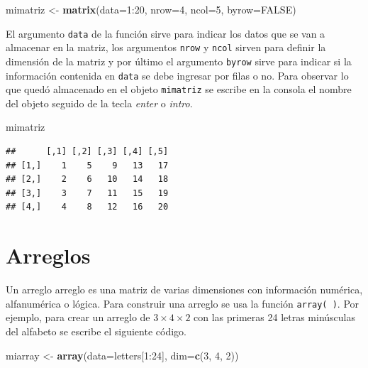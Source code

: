 \documentclass[10pt,]{krantz}
\makeatletter
\newenvironment{Shaded}{\begin{snugshade}}{\end{snugshade}}
\newcommand{\KeywordTok}[1]{\textcolor[rgb]{0.13,0.29,0.53}{\textbf{{#1}}}}
\newcommand{\DataTypeTok}[1]{\textcolor[rgb]{0.13,0.29,0.53}{{#1}}}
\newcommand{\DecValTok}[1]{\textcolor[rgb]{0.00,0.00,0.81}{{#1}}}
\newcommand{\StringTok}[1]{\textcolor[rgb]{0.31,0.60,0.02}{{#1}}}
\newcommand{\OtherTok}[1]{\textcolor[rgb]{0.56,0.35,0.01}{{#1}}}
\newcommand{\NormalTok}[1]{{#1}}
\newenvironment{kframe}{%
\medskip{}
\setlength{\fboxsep}{.8em}
 \def\at@end@of@kframe{}%
 \ifinner\ifhmode%
  \def\at@end@of@kframe{\end{minipage}}%
  \begin{minipage}{\columnwidth}%
 \fi\fi%
 \def\FrameCommand##1{\hskip\@totalleftmargin \hskip-\fboxsep
 \colorbox{shadecolor}{##1}\hskip-\fboxsep
     \hskip-\linewidth \hskip-\@totalleftmargin \hskip\columnwidth}%
 \MakeFramed {\advance\hsize-\width
   \@totalleftmargin\z@ \linewidth\hsize
   \@setminipage}}%
 {\par\unskip\endMakeFramed%
 \at@end@of@kframe}
\renewenvironment{Shaded}{\begin{kframe}}{\end{kframe}}
\makeatother
\begin{document}
\begin{Shaded}
\begin{Highlighting}[]
\NormalTok{mimatriz <-}\StringTok{ }\KeywordTok{matrix}\NormalTok{(}\DataTypeTok{data=}\DecValTok{1}\NormalTok{:}\DecValTok{20}\NormalTok{, }\DataTypeTok{nrow=}\DecValTok{4}\NormalTok{, }\DataTypeTok{ncol=}\DecValTok{5}\NormalTok{, }\DataTypeTok{byrow=}\OtherTok{FALSE}\NormalTok{)}
\end{Highlighting}
\end{Shaded}

El argumento \texttt{data} de la función sirve para indicar los datos
que se van a almacenar en la matriz, los argumentos \texttt{nrow} y
\texttt{ncol} sirven para definir la dimensión de la matriz y por último
el argumento \texttt{byrow} sirve para indicar si la información
contenida en \texttt{data} se debe ingresar por filas o no. Para
observar lo que quedó almacenado en el objeto \texttt{mimatriz} se
escribe en la consola el nombre del objeto seguido de la tecla
\textit{enter} o \textit{intro}.

\begin{Shaded}
\begin{Highlighting}[]
\NormalTok{mimatriz}
\end{Highlighting}
\end{Shaded}

\begin{verbatim}
##      [,1] [,2] [,3] [,4] [,5]
## [1,]    1    5    9   13   17
## [2,]    2    6   10   14   18
## [3,]    3    7   11   15   19
## [4,]    4    8   12   16   20
\end{verbatim}

\section{\texorpdfstring{Arreglos 
}{Arreglos  }}\label{arreglos}

Un arreglo arreglo es una matriz de varias dimensiones con información
numérica, alfanumérica o lógica. Para construir una arreglo se usa la
función \texttt{array(\ )}. Por ejemplo, para crear un arreglo de
\(3 \times 4 \times 2\) con las primeras 24 letras minúsculas del
alfabeto se escribe el siguiente código.

\begin{Shaded}
\begin{Highlighting}[]
\NormalTok{miarray <-}\StringTok{ }\KeywordTok{array}\NormalTok{(}\DataTypeTok{data=}\NormalTok{letters[}\DecValTok{1}\NormalTok{:}\DecValTok{24}\NormalTok{], }\DataTypeTok{dim=}\KeywordTok{c}\NormalTok{(}\DecValTok{3}\NormalTok{, }\DecValTok{4}\NormalTok{, }\DecValTok{2}\NormalTok{))}
\end{Highlighting}
\end{Shaded}
\end{document}
